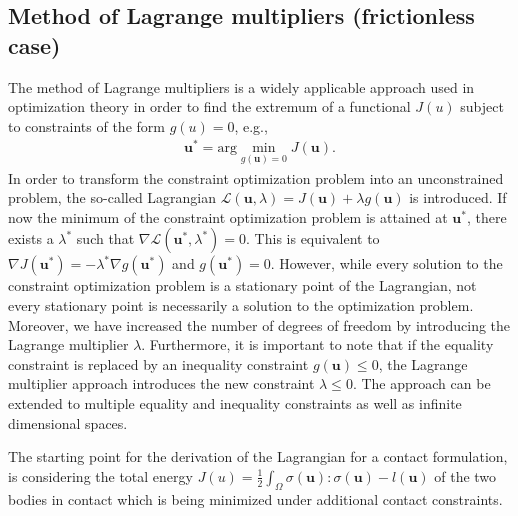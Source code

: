 \documentclass[12pt]{article}
\newcommand{\mbf}[1]{\mathbf{#1}}
\newcommand{\mrm}[1]{\mathrm{#1}}
\newcommand{\mcl}[1]{\mathcal{#1}}
\newcommand{\mbu}{\mbf{u}}
\begin{document}
\subsection{Method of Lagrange multipliers (frictionless case)}
The method of Lagrange multipliers is a widely applicable approach used in optimization theory in order to find the extremum of a functional $J(u)$ subject to constraints of the form $g(u) = 0$, e.g.,
\begin{align*}
  \bm u^{\ast} = \mrm{arg}\min_{g(\bm u) = 0}J(\bm u).
\end{align*}
In order to transform the constraint optimization problem into an unconstrained problem, the so-called Lagrangian $\mcl{L}(\bm u, \lambda) = J(\bm u)+\lambda g(\bm u)$ is introduced. 
If now the minimum of the constraint optimization problem is attained at $\bm u^{\ast}$, there exists a $\lambda^{\ast}$ such that $\nabla \mcl{L}(\bm u^{\ast}, \lambda^{\ast}) = 0$. This is equivalent to
$\nabla J(\bm{u}^{\ast}) = -\lambda^{\ast} \nabla g(\bm u^{\ast})$ and $g(\bm{u}^{\ast}) = 0$. 
However, while every solution to the constraint optimization problem is a stationary point of the Lagrangian, not every stationary point is necessarily a solution to the optimization problem. 
Moreover, we have increased the number of degrees of freedom by introducing the Lagrange multiplier $\lambda$. 
Furthermore, it is important to note that if the equality constraint is replaced by an inequality constraint $g(\bm u) \leq 0$, the Lagrange multiplier approach introduces the new constraint $\lambda \leq 0$.
The approach can be extended to multiple equality and inequality constraints as well as infinite dimensional spaces.

The starting point for the derivation of the Lagrangian for a contact formulation, is
considering the total energy $J(u) =\frac{1}{2} \int_{\Omega}\sigma(\mbu):\sigma(\mbu)-l(\mbu)$ of the two bodies in contact which is being minimized under
additional contact constraints.
\end{document}
